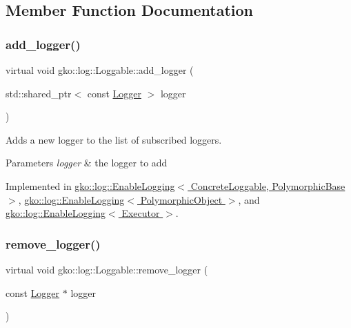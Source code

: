 \subsection{Member Function Documentation}
\mbox{\label{classgko_1_1log_1_1Loggable_aa2bb887b5ef7e75fa1a30ee1896ed932}} 
\subsubsection{\texorpdfstring{add\+\_\+logger()}{add\_logger()}}
{\footnotesize\ttfamily virtual void gko\+::log\+::\+Loggable\+::add\+\_\+logger (\begin{DoxyParamCaption}\item[{std\+::shared\+\_\+ptr$<$ const \hyperlink{classgko_1_1log_1_1Logger}{Logger} $>$}]{logger }\end{DoxyParamCaption})\hspace{0.3cm}{\ttfamily [pure virtual]}}



Adds a new logger to the list of subscribed loggers. 


\begin{DoxyParams}{Parameters}
{\em logger} & the logger to add \\
\hline
\end{DoxyParams}


Implemented in \hyperlink{classgko_1_1log_1_1EnableLogging_a7b3493c14a37b4d46487d9c636d784f2}{gko\+::log\+::\+Enable\+Logging$<$ Concrete\+Loggable, Polymorphic\+Base $>$}, \hyperlink{classgko_1_1log_1_1EnableLogging_a7b3493c14a37b4d46487d9c636d784f2}{gko\+::log\+::\+Enable\+Logging$<$ Polymorphic\+Object $>$}, and \hyperlink{classgko_1_1log_1_1EnableLogging_a7b3493c14a37b4d46487d9c636d784f2}{gko\+::log\+::\+Enable\+Logging$<$ Executor $>$}.

\mbox{\label{classgko_1_1log_1_1Loggable_a5de4092a74cf04f30f13636d49aaec8b}} 
\subsubsection{\texorpdfstring{remove\+\_\+logger()}{remove\_logger()}}
{\footnotesize\ttfamily virtual void gko\+::log\+::\+Loggable\+::remove\+\_\+logger (\begin{DoxyParamCaption}\item[{const \hyperlink{classgko_1_1log_1_1Logger}{Logger} $\ast$}]{logger }\end{DoxyParamCaption})\hspace{0.3cm}{\ttfamily [pure virtual]}}



